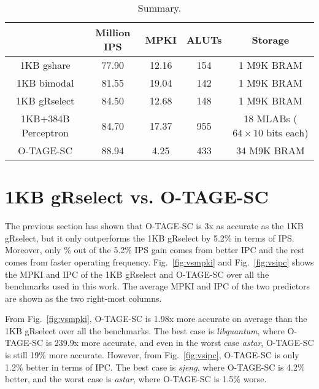 \begin{table}[h]
\begin{center}
\def\arraystretch{1.2}
\begin{tabular}{|c|c|c|c|c|}
\hline
 & \textbf{Million IPS} & \textbf{MPKI} & \textbf{ALUTs} & \textbf{Storage} \\ \hline
1KB gshare			& 77.90	& 12.16	& 154 & 1 M9K BRAM \\ \hline
1KB bimodal			& 81.55	& 19.04	& 142 & 1 M9K BRAM \\ \hline
1KB gRselect		& 84.50	& 12.68	& 148 & 1 M9K BRAM \\ \hline
1KB+384B Perceptron	& 84.70	& 17.37	& 955 & 18 MLABs ($64 \times 10$ bits each) \\ \hline
O-TAGE-SC			& 88.94	& 4.25	& 433 & 34 M9K BRAM \\ \hline
\end{tabular}
\caption{Summary.\label{tab:summary}}
\end{center}
\end{table}


\section{1KB gRselect vs. O-TAGE-SC}
\label{sec:eval:vs}
The previous section has shown that \mbox{O-TAGE-SC} is \mytilde 3x as accurate as the 1KB gRselect, but it only outperforms the 1KB gRselect by 5.2\% in terms of IPS. Moreover, only \% out of the 5.2\% IPS gain comes from better IPC and the rest comes from faster operating frequency. Fig.~\ref{fig:vsmpki} and Fig.~\ref{fig:vsipc} shows the MPKI and IPC of the 1KB gRselect and \mbox{O-TAGE-SC} over all the benchmarks used in this work. The average MPKI and IPC of the two predictors are shown as the two right-most columns.



From Fig.~\ref{fig:vsmpki}, \mbox{O-TAGE-SC} is 1.98x more accurate on average than the 1KB gRselect over all the benchmarks. The best case is \textit{libquantum}, where \mbox{O-TAGE-SC} is 239.9x more accurate, and even in the worst case \textit{astar}, \mbox{O-TAGE-SC} is still 19\% more accurate. However, from Fig.~\ref{fig:vsipc}, \mbox{O-TAGE-SC} is only 1.2\% better in terms of IPC. The best case is \textit{sjeng}, where \mbox{O-TAGE-SC} is 4.2\% better, and the worst case is \textit{astar}, where \mbox{O-TAGE-SC} is 1.5\% worse.

